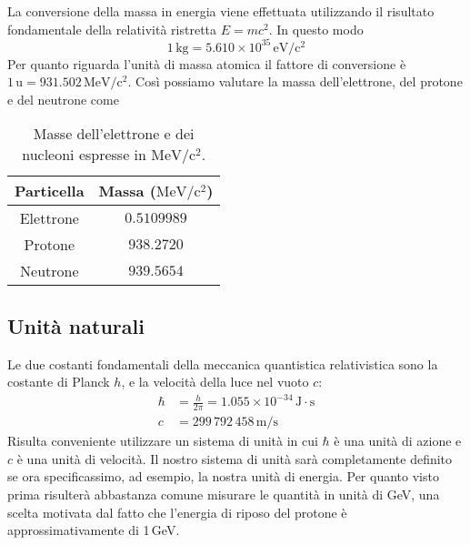 La conversione della massa in energia viene effettuata utilizzando il risultato fondamentale della relatività ristretta $E = mc^2$. In questo modo   
    \begin{equation*}
        1 \, \mathrm{kg} = 5.610 \times 10^{35} \,\mathrm{eV} / \mathrm{c}^2
    \end{equation*}
Per quanto riguarda l'unità di massa atomica il fattore di conversione è $1 \, \mathrm{u} = 931.502 \, \mathrm{MeV}/\mathrm{c}^2$. Così possiamo valutare la massa
dell'elettrone, del protone e del neutrone come
    \begin{table}[ht]
        \centering
        \begin{tabular}{cc}
            \toprule
            Particella & Massa ($\mathrm{MeV}/\mathrm{c}^2$) \\
            \midrule
            Elettrone & $0.5109989$ \\
            Protone & $938.2720$ \\
            Neutrone & $939.5654$ \\
            \bottomrule
        \end{tabular}
        \caption{Masse dell'elettrone e dei nucleoni espresse in $\mathrm{MeV}/\mathrm{c}^2$.}
        \label{tab: particle masses in MeV}
    \end{table}
\subsection{Unità naturali}
Le due costanti fondamentali della meccanica quantistica relativistica sono la costante di Planck $h$, e la velocità della luce nel vuoto $c$:
    \begin{align*}
        \hbar & = \frac{h}{2 \pi} = 1.055 \times 10^{-34} \, \mathrm{J} \cdot \mathrm{s} \\
        c & = 299 \, 792 \, 458 \, \mathrm{m/s}
    \end{align*}
Risulta conveniente utilizzare un sistema di unità in cui $\hbar$ è una unità di azione e $c$ è una unità di velocità. Il nostro sistema di unità sarà completamente definito se ora specificassimo, ad esempio, la nostra unità di energia. Per quanto visto prima risulterà abbastanza comune misurare le quantità in unità di GeV, una scelta motivata dal fatto che l'energia di riposo del protone è approssimativamente di 1\,GeV.

